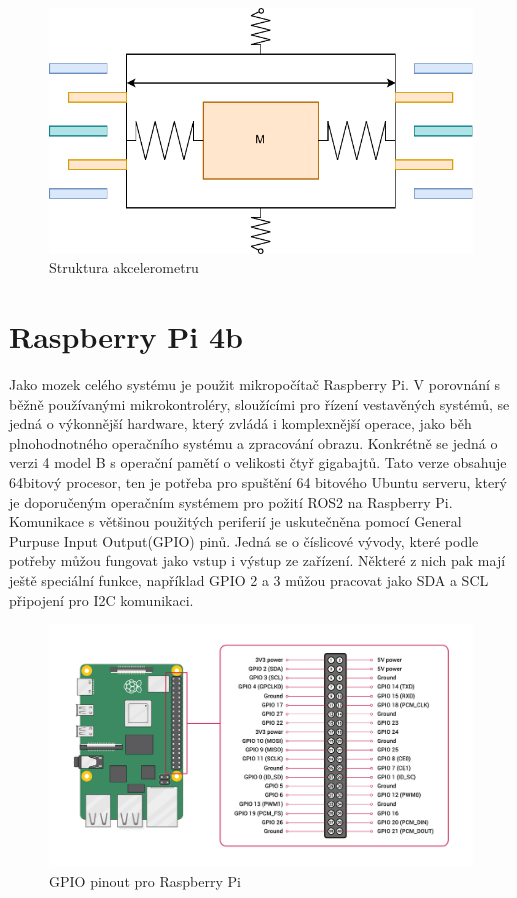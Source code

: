 \begin{figure}[h!]
	\centering
	\includegraphics[scale=0.8]{obrazky-figures/gyroscope.pdf}
	\caption{Struktura akcelerometru}
	\label{}
\end{figure}

\section{Raspberry Pi 4b}
Jako mozek celého systému je použit mikropočítač Raspberry Pi. V porovnání s běžně používanými mikrokontroléry, sloužícími pro řízení vestavěných systémů, se jedná o výkonnější hardware, který zvládá i komplexnější operace, jako běh plnohodnotného operačního systému a zpracování obrazu. Konkrétně se jedná o verzi 4 model B s operační pamětí o velikosti čtyř gigabajtů. Tato verze obsahuje 64bitový procesor, ten je potřeba pro spuštění 64 bitového Ubuntu serveru, který je doporučeným operačním systémem pro požití ROS2 na Raspberry Pi.
Komunikace s většinou použitých periferií je uskutečněna pomocí General Purpuse Input Output(GPIO) pinů. Jedná se o číslicové vývody, které podle potřeby můžou fungovat jako vstup i výstup ze zařízení. Některé z nich pak mají ještě speciální funkce, například GPIO 2 a 3 můžou pracovat jako SDA a SCL připojení pro I2C komunikaci.

\begin{figure}[h!]
	\centering
	\includegraphics[scale=0.15]{obrazky-figures/gpio_pinout.png}
	\caption{GPIO pinout pro Raspberry Pi}
	\label{}
\end{figure}

